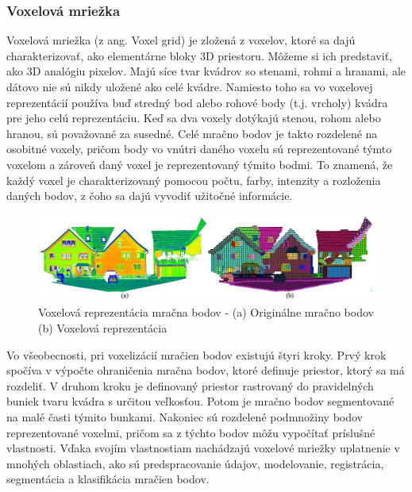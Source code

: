 \subsubsection{Voxelová mriežka}
\noindent Voxelová mriežka (z ang. Voxel grid) je zložená z voxelov, ktoré sa dajú charakterizovať, ako elementárne bloky 3D priestoru. Môžeme si ich predstaviť, ako 3D analógiu pixelov. Majú síce tvar kvádrov so stenami, rohmi a hranami, ale dátovo nie sú nikdy uložené ako celé kvádre. Namiesto toho sa vo voxelovej reprezentácií používa buď stredný bod alebo rohové body (t.j. vrcholy) kvádra pre jeho celú reprezentáciu. Keď sa dva voxely dotýkajú stenou, rohom alebo hranou, sú považované za susedné. Celé mračno bodov je takto rozdelené na osobitné voxely, pričom body vo vnútri daného voxelu sú reprezentované týmto voxelom a zároveň daný voxel je reprezentovaný týmito bodmi. To znamená, že každý voxel je charakterizovaný pomocou počtu, farby, intenzity a rozloženia daných bodov, z čoho sa dajú vyvodiť užitočné informácie. \cite{voxel_grid} 
\begin{figure}[!htbp]
  \centering
  \includegraphics[width=15cm]{img/pc_vs_vox.jpg}
  \caption{Voxelová reprezentácia mračna bodov - (a) Originálne mračno bodov (b) Voxelová reprezentácia \cite{voxel_grid}}
  \label{voxel_example}
\end{figure}
\newline\indent Vo všeobecnosti, pri voxelizácií mračien bodov existujú štyri kroky. Prvý krok spočíva v výpočte ohraničenia mračna bodov, ktoré definuje priestor, ktorý sa má rozdeliť. V druhom kroku je definovaný priestor rastrovaný do pravidelných buniek tvaru kvádra s určitou veľkosťou. Potom je mračno bodov segmentované na malé časti týmito bunkami. Nakoniec sú rozdelené podmnožiny bodov reprezentované voxelmi, pričom sa z týchto bodov môžu vypočítať príslušné vlastnosti. \cite{voxel_grid}
\newline\indent Vďaka svojím vlastnostiam nachádzajú voxelové mriežky uplatnenie v mnohých oblastiach, ako sú predspracovanie údajov, modelovanie, registrácia, segmentácia a klasifikácia mračien bodov. 

